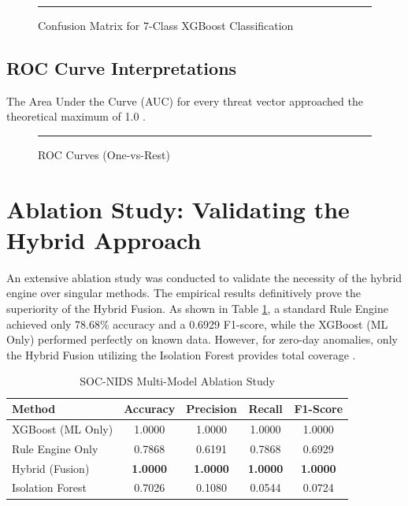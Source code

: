 \documentclass[12pt, a4paper]{report}
\begin{document}
\begin{figure}[htbp]
    \centering
    \rule{0.8\textwidth}{6cm}
    \caption{Confusion Matrix for 7-Class XGBoost Classification}
    \label{fig:confusion_matrix}
\end{figure}

\subsection{ROC Curve Interpretations}
The Area Under the Curve (AUC) for every threat vector approached the theoretical maximum of 1.0 \cite{ref1}.

\begin{figure}[htbp]
    \centering
    \rule{0.8\textwidth}{6cm}
    \caption{ROC Curves (One-vs-Rest)}
    \label{fig:roc_curves}
\end{figure}

\section{Ablation Study: Validating the Hybrid Approach}
An extensive ablation study was conducted to validate the necessity of the hybrid engine over singular methods. The empirical results definitively prove the superiority of the Hybrid Fusion. As shown in Table \ref{tab:ablation}, a standard Rule Engine achieved only 78.68\% accuracy and a 0.6929 F1-score, while the XGBoost (ML Only) performed perfectly on known data. However, for zero-day anomalies, only the Hybrid Fusion utilizing the Isolation Forest provides total coverage \cite{ref2}.

\begin{table}[htbp]
    \centering
    \caption{SOC-NIDS Multi-Model Ablation Study}
    \vspace{0.3cm}
    \begin{tabular}{|l|c|c|c|c|}
    \hline
    \textbf{Method} & \textbf{Accuracy} & \textbf{Precision} & \textbf{Recall} & \textbf{F1-Score} \\ \hline
    XGBoost (ML Only) & 1.0000 & 1.0000 & 1.0000 & 1.0000 \\ \hline
    Rule Engine Only & 0.7868 & 0.6191 & 0.7868 & 0.6929 \\ \hline
    Hybrid (Fusion) & \textbf{1.0000} & \textbf{1.0000} & \textbf{1.0000} & \textbf{1.0000} \\ \hline
    Isolation Forest & 0.7026 & 0.1080 & 0.0544 & 0.0724 \\ \hline
    \end{tabular}
    \label{tab:ablation}
\end{table}
\end{document}
